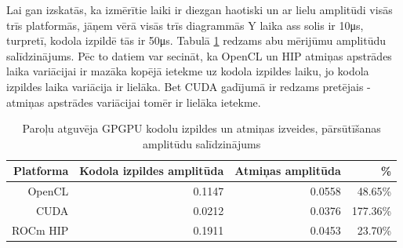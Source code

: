 Lai gan izskatās, ka izmērītie laiki ir diezgan haotiski un ar lielu amplitūdi
visās trīs platformās, jāņem vērā visās trīs diagrammās Y laika ass solis ir
10\si{\micro\second}, turpretī, kodola izpildē tās ir 50\si{\micro\second}.
Tabulā \ref{tab:amplitudas} redzams abu mērijūmu amplitūdu salīdzinājums.
Pēc to datiem var secināt, ka OpenCL un HIP atmiņas apstrādes laika variācijai
ir mazāka kopējā ietekme uz kodola izpildes laiku, jo kodola izpildes laika
variācija ir lielāka. Bet CUDA gadījumā ir redzams pretējais - atmiņas apstrādes
variācijai tomēr ir lielāka ietekme.

\begin{table}[H]
    \centering
    \caption{Paroļu atguvēja GPGPU kodolu izpildes un atmiņas izveides,
    pārsūtīšanas amplitūdu salīdzinājums}
\label{tab:amplitudas}
\begin{tabular}{rrrr}
    Platforma & Kodola izpildes amplitūda & Atmiņas amplitūda & \% \\ \hline
OpenCL & 0.1147 & 0.0558 & 48.65\% \\
CUDA & 0.0212 & 0.0376 & 177.36\% \\
ROCm HIP & 0.1911 & 0.0453 & 23.70\% \\
\hline
\end{tabular}
\end{table}
